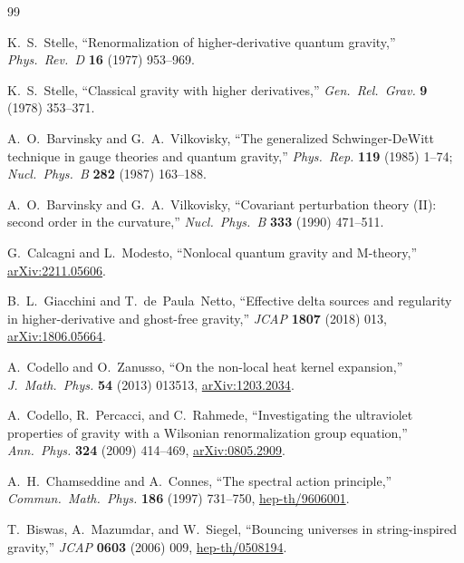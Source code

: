 \documentclass[11pt,a4paper]{article}
\theoremstyle{plain}
\theoremstyle{definition}
\begin{document}
\begin{thebibliography}{99}

K.~S.~Stelle,
``Renormalization of higher-derivative quantum gravity,''
\emph{Phys.\ Rev.\ D} \textbf{16} (1977) 953--969.

K.~S.~Stelle,
``Classical gravity with higher derivatives,''
\emph{Gen.\ Rel.\ Grav.} \textbf{9} (1978) 353--371.

A.~O.~Barvinsky and G.~A.~Vilkovisky,
``The generalized Schwinger-DeWitt technique in gauge theories and
quantum gravity,''
\emph{Phys.\ Rep.} \textbf{119} (1985) 1--74;
\emph{Nucl.\ Phys.\ B} \textbf{282} (1987) 163--188.

A.~O.~Barvinsky and G.~A.~Vilkovisky,
``Covariant perturbation theory (II): second order in the curvature,''
\emph{Nucl.\ Phys.\ B} \textbf{333} (1990) 471--511.

G.~Calcagni and L.~Modesto,
``Nonlocal quantum gravity and M-theory,''
\href{https://arxiv.org/abs/2211.05606}{arXiv:2211.05606}.

B.~L.~Giacchini and T.~de~Paula~Netto,
``Effective delta sources and regularity in higher-derivative and
ghost-free gravity,''
\emph{JCAP} \textbf{1807} (2018) 013,
\href{https://arxiv.org/abs/1806.05664}{arXiv:1806.05664}.

A.~Codello and O.~Zanusso,
``On the non-local heat kernel expansion,''
\emph{J.\ Math.\ Phys.} \textbf{54} (2013) 013513,
\href{https://arxiv.org/abs/1203.2034}{arXiv:1203.2034}.

A.~Codello, R.~Percacci, and C.~Rahmede,
``Investigating the ultraviolet properties of gravity with a
Wilsonian renormalization group equation,''
\emph{Ann.\ Phys.} \textbf{324} (2009) 414--469,
\href{https://arxiv.org/abs/0805.2909}{arXiv:0805.2909}.

A.~H.~Chamseddine and A.~Connes,
``The spectral action principle,''
\emph{Commun.\ Math.\ Phys.} \textbf{186} (1997) 731--750,
\href{https://arxiv.org/abs/hep-th/9606001}{hep-th/9606001}.

T.~Biswas, A.~Mazumdar, and W.~Siegel,
``Bouncing universes in string-inspired gravity,''
\emph{JCAP} \textbf{0603} (2006) 009,
\href{https://arxiv.org/abs/hep-th/0508194}{hep-th/0508194}.


\end{thebibliography}
\end{document}
